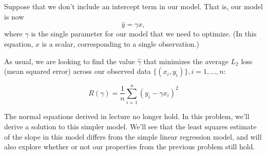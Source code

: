 \documentclass[addpoints, 12pt]{exam}
\theoremstyle{definition}
\newtheorem*{answer}{Answer}
\begin{document}
\begin{questions}
\end{questions}

\newpage

\noindent Suppose that we don't include an intercept term in
our model. That is, our model is now
$$\hat{y} = \gamma x,$$
where $\gamma$ is the single parameter for our model that we need to optimize. (In this equation, $x$ is a scalar, corresponding to a single observation.)

\noindent As usual, we are looking to find the value $\hat{\gamma}$ that minimizes the average $L_2$ loss (mean squared error) across our observed data $\{(x_i, y_i)\}, i = 1, \ldots, n$:

$$R(\gamma) = \frac{1}{n}\sum_{i=1}^n (y_i - \gamma x_i)^2$$

\noindent The normal equations derived in lecture no longer hold. In this problem, we'll derive a solution to this simpler model. We'll see that the least squares estimate of the slope in this model differs from the simple linear regression model, and will also explore whether or not our properties from the previous problem still hold.

\newpage
\end{document}
